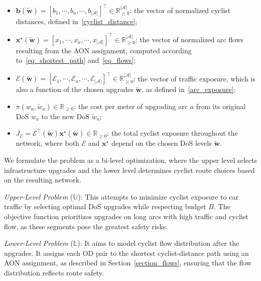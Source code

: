 \documentclass[letterpaper, 10 pt, conference]{ieeeconf}  %
\begin{document}
\begin{itemize}
    \item $\mathbf{b}(\tilde{\mathbf{w}}) = \left [ b_{1}, \cdots, b_{a}, \cdots, b_{|\mathcal{A}|} \right ]^\top \in \mathbb{R}^{|\mathcal{A}|}_{\geq 0}$: the vector of normalized  cyclist distances, defined in~\eqref{cyclist_distance};
    \item $\mathbf{x}^\star(\tilde{\mathbf{w}}) = \left [ x_{1}, \cdots, x_{a}, \cdots, x_{|\mathcal{A}|} \right ]^\top \in \mathbb{R}^{|\mathcal{A}|}_{\geq 0}$: the vector of normalized arc flows resulting from the AON assignment, computed according to~\eqref{eq_shortest_path} and~\eqref{eq_flows};
    \item $\boldsymbol{\mathcal{E}}(\tilde{\mathbf{w}}) = \left [ \mathcal{E}_{1}, \cdots, \mathcal{E}_{a}, \cdots, \mathcal{E}_{|\mathcal{A}|} \right ]^\top \in \mathbb{R}^{|\mathcal{A}|}_{\geq 0}$: the vector of traffic exposure, which is also a function of the chosen upgrades $\tilde{\mathbf{w}}$, as defined in~\eqref{arc_exposure};
    \item $\pi(w_{a},\tilde{w}_{a}) \in \mathbb{R}_{\geq 0}$: the cost per meter of upgrading arc $a$ from its original DoS $w_{a}$ to the new DoS $\tilde{w}_{a}$;
    \item $J_{\mathcal{E}} = \boldsymbol{\mathcal{E}}^\top(\tilde{\mathbf{w}}) \mathbf{x}^\star(\tilde{\mathbf{w}}) \in \mathbb{R}_{\geq 0}$: the total cyclist exposure throughout the network, where both $\boldsymbol{\mathcal{E}}$ and $\mathbf{x}^{\star}$ depend on the chosen DoS levels $\tilde{\mathbf{w}}$.
\end{itemize}
We formulate the problem as a bi-level optimization, where the upper level selects infrastructure upgrades and the lower level determines cyclist route choices based on the resulting network.

\textit{Upper-Level Problem} ($\mathbb{U}$): This attempts to minimize cyclist exposure to car traffic by selecting optimal DoS upgrades while respecting budget $B$. The objective function prioritizes upgrades on long arcs with high traffic and cyclist flow, as these segments pose the greatest safety risks.

\textit{Lower-Level Problem} ($\mathbb{L}$): It aims to model cyclist flow distribution after the upgrades. It assigns each OD pair to the shortest cyclist-distance path using an AON assignment, as described in Section~\ref{section_flows}, ensuring that the flow distribution reflects route safety.
\end{document}
